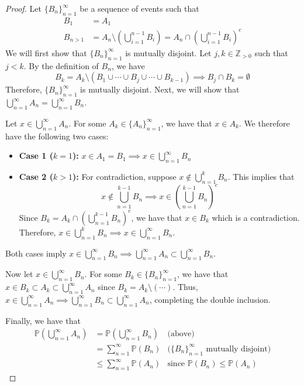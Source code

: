 \documentclass[11pt]{article}
\newcommand{\p}{\mathbb{P}}
\newcommand{\z}{\mathbb{Z}}
\begin{document}
\begin{enumerate}
\begin{proof}
  Let \(\{B_n\}_{n=1}^\infty\) be a sequence of events such that
  \begin{align*}
    B_1 &= A_1\\
    B_{n>1} &= A_n\setminus\left(\bigcup_{i=1}^{n-1} B_i\right) = A_n\cap\left(\bigcup_{i=1}^{n-1} B_i\right)^c
  \end{align*}
  We will first show that \(\{B_n\}_{n=1}^\infty\) is mutually disjoint. Let \(j,k \in\z_{>0}\) such that \(j<k\). By the definition of \(B_n\), we have
  \[B_k = A_k\setminus(B_1\cup\cdots\cup B_j\cup\cdots\cup B_{k-1})\implies B_j\cap B_k=\emptyset\]
  Therefore, \(\{B_n\}_{n=1}^\infty\) is mutually disjoint. Next, we will show that
  \(\bigcup_{n=1}^\infty A_n = \bigcup_{n=1}^\infty B_n\). 
  
  Let \(x\in\bigcup_{n=1}^\infty A_n\). For some \(A_k\in\{A_n\}_{n=1}^\infty\), we have that \(x\in A_k\). We therefore have the following two cases:
  \begin{itemize}
    \item \textbf{Case 1 (\(k=1\)):} \(x\in A_1=B_1\implies x\in\bigcup_{n=1}^\infty B_n\)
    \item \textbf{Case 2 (\(k>1\)):} For contradiction, suppose \(x\notin\bigcup_{n=1}^k B_n\). This implies that 
    \[x\notin\bigcup_{n=1}^{k-1} B_n\implies x\in\left(\bigcup_{n=1}^{k-1} B_n\right)^c\]
    Since \(B_k = A_k \cap \left(\bigcup_{n=1}^{k-1} B_n\right)^c\), we have that \(x\in B_k\) which is a contradiction. Therefore, \(x\in\bigcup_{n=1}^k B_n\implies x\in\bigcup_{n=1}^\infty B_n\).
  \end{itemize}
  Both cases imply \(x\in\bigcup_{n=1}^\infty B_n\implies \bigcup_{n=1}^\infty A_n\subset \bigcup_{n=1}^\infty B_n\).
  
  Now let \(x\in\bigcup_{n=1}^\infty B_n\). For some \(B_k\in\{B_n\}_{n=1}^\infty\), we have that \(x\in B_k\subset A_k\subset \bigcup_{n=1}^\infty A_n\) since
  \(B_k = A_k\setminus (\cdots)\). Thus, \(x\in\bigcup_{n=1}^\infty A_n\implies\bigcup_{n=1}^\infty B_n\subset \bigcup_{n=1}^\infty A_n\), completing the double inclusion.
  
  Finally, we have that 
  \begin{align*}
    \p(\bigcup_{n=1}^\infty A_n) &= \p(\bigcup_{n=1}^\infty B_n) & \text{(above)}\\
    &= \sum_{n=1}^\infty \p(B_n) & \text{(\(\{B_n\}_{n=1}^\infty\) mutually disjoint)}\\
    &\leq \sum_{n=1}^\infty \p(A_n) & \text{since \(\p(B_n)\leq \p(A_n)\)}
  \end{align*}
\end{proof}
    
\end{enumerate}
\end{document}
